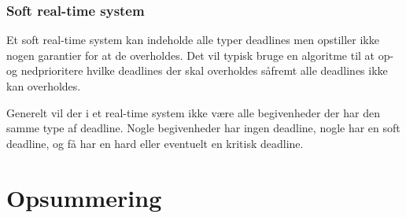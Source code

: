 \subsubsection{Soft real-time system}
Et soft real-time system kan indeholde alle typer deadlines men opstiller ikke nogen garantier for at de overholdes. Det vil typisk bruge en algoritme til at op- og nedprioritere hvilke deadlines der skal overholdes såfremt alle deadlines ikke kan overholdes.

Generelt vil der i et real-time system ikke være alle begivenheder der har den samme type af deadline. Nogle begivenheder har ingen deadline, nogle har en soft deadline, og få har en hard eller eventuelt en kritisk deadline. 
 






\section{Opsummering}

